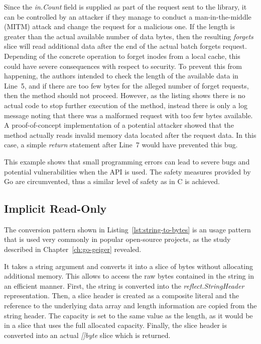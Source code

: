 Since the \textit{in.Count} field is supplied as part of the request sent to the library, it can be controlled by an
attacker if they manage to conduct a man-in-the-middle (\acrshort{MITM}) attack and change the request for a malicious
one.
If the length is greater than the actual available number of data bytes, then the resulting \textit{forgets} slice will
read additional data after the end of the actual batch forgets request.
Depending of the concrete operation to forget inodes from a local cache, this could have severe consequences with
respect to security.
To prevent this from happening, the authors intended to check the length of the available data in Line~5, and if there
are too few bytes for the alleged number of forget requests, then the method should not proceed.
However, as the listing shows there is no actual code to stop further execution of the method, instead there is only a
log message noting that there was a malformed request with too few bytes available.
A proof-of-concept implementation of a potential attacker showed that the method actually reads invalid memory data
located after the request data.
In this case, a simple \textit{return} statement after Line~7 would have prevented this bug.

This example shows that small programming errors can lead to severe bugs and potential vulnerabilities when the
\unsafe{} \acrshort{API} is used.
The safety measures provided by Go are circumvented, thus a similar level of safety as in C is achieved.



\subsection{Implicit Read-Only}\label{subsec:unsafe-security-problems:slice-casts:read-only}

The conversion pattern shown in Listing~\ref{lst:string-to-bytes} is an \unsafe{} usage pattern that is used very
commonly in popular open-source projects, as the study described in Chapter~\ref{ch:go-geiger} revealed.



It takes a string argument and converts it into a slice of bytes without allocating additional memory.
This allows to access the raw bytes contained in the string in an efficient manner.
First, the string is converted into the \textit{reflect.StringHeader} representation.
Then, a slice header is created as a composite literal and the reference to the underlying data array and length
information are copied from the string header.
The capacity is set to the same value as the length, as it would be in a slice that uses the full allocated capacity.
Finally, the slice header is converted into an actual \textit{[]byte} slice which is returned.


